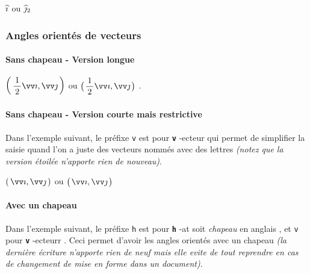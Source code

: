 \documentclass[12pt,a4paper]{article}
\theoremstyle{definition}
\newcommand\whyprefix[2]{%
	\textbf{\prefix{#1}}-#2%
}
\newcommand\prefix[1]{%
	\texttt{#1}%
}
\newcommand\inenglish[1]{%
	\emph{\og #1 \fg} en anglais%
}
\begin{document}
\begin{latexex}
$\anglein{i}$ ou
$\anglein*{j}{2}$
\end{latexex}




\subsubsection{Angles orientés de vecteurs}

\paragraph{Sans chapeau - Version longue}

\begin{latexex}
$\displaystyle
 \angleorient{\frac{1}{2} \vect{i}}%
             {\vect{j}}$
ou
$\displaystyle
 \angleorient*{\frac{1}{2} \vect{i}}%
              {\vect{j}}$ .
\end{latexex}




\paragraph{Sans chapeau - Version courte mais restrictive}

Dans l'exemple suivant, le préfixe \prefix{v} est pour \whyprefix{v}{ecteur} qui permet de simplifier la saisie quand l'on a juste des vecteurs nommés avec des lettres
\emph{(notez que la version étoilée n'apporte rien de nouveau)}.

\begin{latexex}
$\vangleorient{i}{j}$
ou
$\vangleorient*{i}{j}$
\end{latexex}




\paragraph{Avec un chapeau}

Dans l'exemple suivant, le préfixe \prefix{h} est pour \whyprefix{h}{at} soit \inenglish{chapeau}, et \prefix{v} pour \whyprefix{v}{ecteurr}.
Ceci permet d'avoir les angles orientés avec un chapeau \emph{(la dernière écriture n'apporte rien de neuf mais elle evite de tout reprendre en cas de changement de mise en forme dans un document)}.
\end{document}
